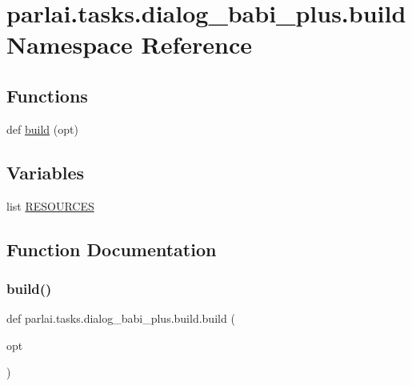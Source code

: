 \hypertarget{namespaceparlai_1_1tasks_1_1dialog__babi__plus_1_1build}{}\section{parlai.\+tasks.\+dialog\+\_\+babi\+\_\+plus.\+build Namespace Reference}
\label{namespaceparlai_1_1tasks_1_1dialog__babi__plus_1_1build}
\subsection*{Functions}
\begin{DoxyCompactItemize}
\item 
def \hyperlink{namespaceparlai_1_1tasks_1_1dialog__babi__plus_1_1build_a744abaf2c667658a3bc25beae9477b94}{build} (opt)
\end{DoxyCompactItemize}
\subsection*{Variables}
\begin{DoxyCompactItemize}
\item 
list \hyperlink{namespaceparlai_1_1tasks_1_1dialog__babi__plus_1_1build_a1bb4d3fa841149fd8c1d8c16c67cc1da}{R\+E\+S\+O\+U\+R\+C\+ES}
\end{DoxyCompactItemize}


\subsection{Function Documentation}
\mbox{\label{namespaceparlai_1_1tasks_1_1dialog__babi__plus_1_1build_a744abaf2c667658a3bc25beae9477b94}} 
\subsubsection{\texorpdfstring{build()}{build()}}
{\footnotesize\ttfamily def parlai.\+tasks.\+dialog\+\_\+babi\+\_\+plus.\+build.\+build (\begin{DoxyParamCaption}\item[{}]{opt }\end{DoxyParamCaption})}



